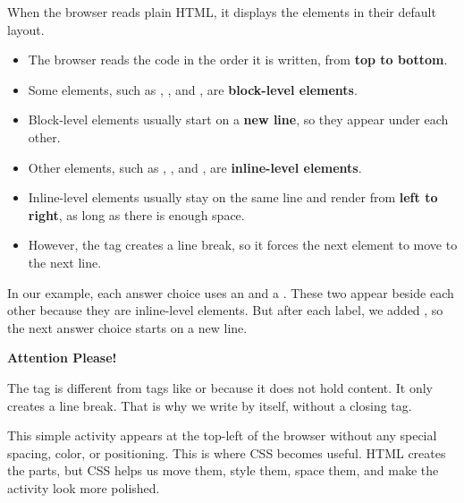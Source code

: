 \documentclass{article}
\begin{document}
\vspace{0.3cm}

When the browser reads plain HTML, it displays the elements in their default layout.

\begin{itemize}[leftmargin=1.2cm, itemsep=4pt]
  \item The browser reads the code in the order it is written, from \textbf{top to bottom}.
  \item Some elements, such as , , and , are \textbf{block-level elements}.
  \item Block-level elements usually start on a \textbf{new line}, so they appear under each other.
  \item Other elements, such as , , and , are \textbf{inline-level elements}.
  \item Inline-level elements usually stay on the same line and render from \textbf{left to right}, as long as there is enough space.
  \item However, the  tag creates a line break, so it forces the next element to move to the next line.
\end{itemize}

In our example, each answer choice uses an  and a . These two appear beside each other because they are inline-level elements. But after each label, we added , so the next answer choice starts on a new line.

\vspace{0.2cm}

\begin{attentionbox}
  \textbf{\Bitter\textcolor{naranja}{Attention Please!}}

  The  tag is different from tags like  or  because it does not hold content.
  It only creates a line break. That is why we write  by itself, without a closing tag.
\end{attentionbox}

This simple activity appears at the top-left of the browser without any special spacing, color, or positioning.
This is where CSS becomes useful. HTML creates the parts, but CSS helps us move them, style them, space them, and make the activity look more polished.

\vspace{0.4cm}
\end{document}
